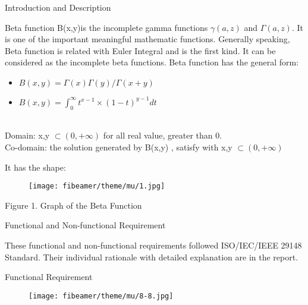 \documentclass[final]{beamer}
\newlength{\onecolwid}
\begin{document}
\begin{frame}
\begin{columns}[t]
\begin{column}{\onecolwid}
\begin{exampleblock}{Introduction and Description}
{\small
Beta function B(x,y)is the incomplete gamma functions $ \gamma (a,z) $ and $\Gamma(a,z)$. It is one of the important meaningful mathematic functions. Generally speaking, Beta function is related with Euler Integral and is the first kind. It can be considered as the incomplete beta functions. Beta function has the general form: \\
\begin{itemize}
\item \State $ B (x,y) =  \Gamma(x) \Gamma(y)  / \Gamma( x+y) $ \\
\item  \State $ B (x,y) =  $$\int_{0}^{\infty} t^{x-1} \times (1-t)^{y-1} dt$$  $ \\ \\

\end{itemize}
\item Domain: x,y $ \subset (0, + \infty)$  for all real value, greater than 0. \\
Co-domain: the solution generated by B(x,y) , satisfy with  x,y $ \subset (0, + \infty)$ 
  \item It has the shape:
  
  \begin{figure}
\texttt{[image: fibeamer/theme/mu/1.jpg]}
\end{figure}
            Figure 1. Graph of the Beta Function   
                
  }
\end{exampleblock}


\begin{exampleblock}{Functional and Non-functional Requirement}
 
 {\small 
 \item   These functional and non-functional requirements followed ISO/IEC/IEEE 29148 Standard. Their individual rationale with detailed explanation are in the report. 
    
              \item Functional Requirement
}      
  \begin{figure}
\texttt{[image: fibeamer/theme/mu/8-8.jpg]}
\end{figure}     



\end{exampleblock}
\end{column}
\end{columns}
\end{frame}
\end{document}
